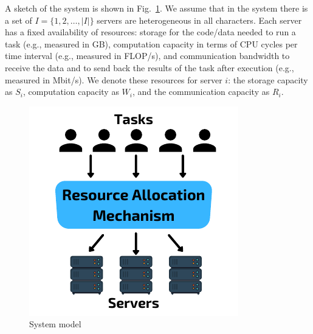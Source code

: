 A sketch of the system is shown in Fig.~\ref{fig:system_model}.
We assume that in the system there is a set of $I = \{1,2,\ldots,\left|I\right|\}$ servers are heterogeneous in all
characters. Each server has a fixed availability of resources: storage for the code/data needed to run a task
(e.g., measured in GB), computation capacity in terms of CPU cycles per time interval (e.g., measured in FLOP/s),
and communication bandwidth to receive the data and to send back the results of the task after execution
(e.g., measured in Mbit/s). We denote these resources for server $i$: the storage capacity as $S_i$, computation
capacity as $W_i$, and the communication capacity as $R_i$.

\begin{figure}
    \centering
    \includegraphics{figures/system_model.pdf}
    \caption{System model}
    \label{fig:system_model}
\end{figure}

